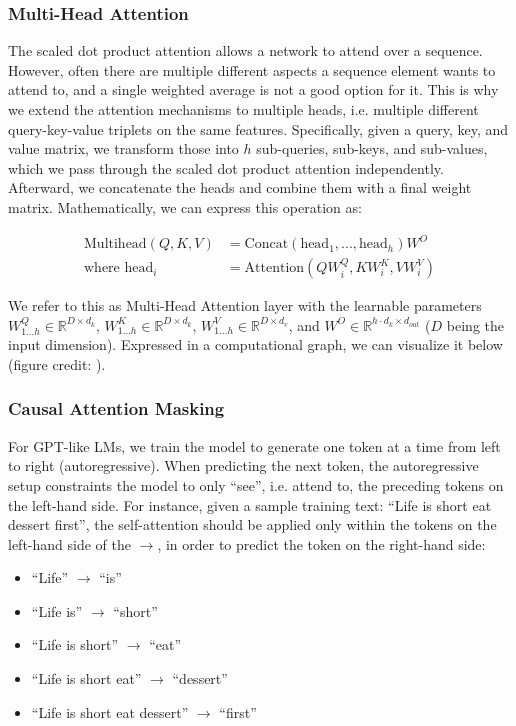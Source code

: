 \subsubsection{Multi-Head Attention}

The scaled dot product attention allows a network to attend over a sequence.
However, often there are multiple different aspects a sequence element wants to attend to,
and a single weighted average is not a good option for it.
This is why we extend the attention mechanisms to multiple heads,
i.e. multiple different query-key-value triplets on the same features.
Specifically, given a query, key, and value matrix, we transform those into $h$ sub-queries, sub-keys,
and sub-values, which we pass through the scaled dot product attention independently.
Afterward, we concatenate the heads and combine them with a final weight matrix.
Mathematically, we can express this operation as:


\begin{align}
    \text{Multihead}(Q,K,V) & = \text{Concat}(\text{head}_1,...,\text{head}_h)W^{O}\\
    \text{where } \text{head}_i & = \text{Attention}(QW_i^Q,KW_i^K, VW_i^V)
\end{align}


We refer to this as Multi-Head Attention layer with the learnable parameters
$W_{1...h}^{Q}\in\mathbb{R}^{D\times d_k}$,
$W_{1...h}^{K}\in\mathbb{R}^{D\times d_k}$,
$W_{1...h}^{V}\in\mathbb{R}^{D\times d_v}$,
and $W^{O}\in\mathbb{R}^{h\cdot d_k\times d_{out}}$ ($D$ being the input dimension).
Expressed in a computational graph, we can visualize it below
(figure credit: \cite{vaswani2017attention}).

\subsubsection{Causal Attention Masking}
For GPT-like LMs, we train the model to generate one token at a time from left to right (autoregressive). When predicting the next token, the autoregressive setup constraints the model to only ``see'', i.e. attend to, the preceding tokens on the left-hand side. For instance, given a sample training text: ``Life is short eat dessert first'', the self-attention should be applied only within the tokens on the left-hand side of the $\rightarrow$, in order to predict the token on the right-hand side:
\begin{itemize}
    \item ``Life'' $\rightarrow$ ``is''
    \item ``Life is'' $\rightarrow$ ``short''
    \item ``Life is short'' $\rightarrow$ ``eat''
    \item ``Life is short eat'' $\rightarrow$ ``dessert''
    \item ``Life is short eat dessert'' $\rightarrow$ ``first''
\end{itemize}


